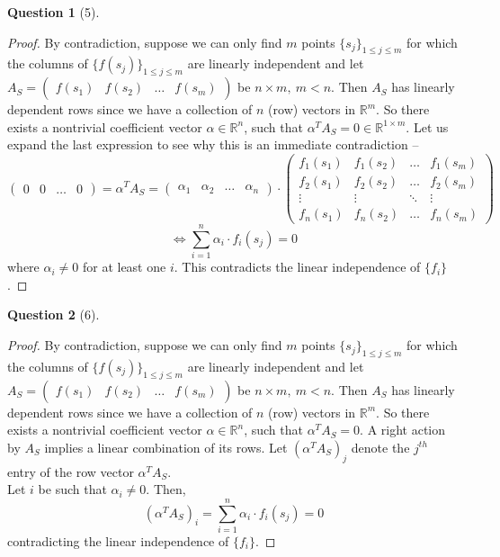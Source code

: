 \documentclass[11pt]{article}
\theoremstyle{quest}
\newtheorem*{question}{Question}
\begin{document}
\begin{question}[5]
\end{question}
\begin{proof}
By contradiction, suppose we can only find $m$ points $\{s_j\}_{1 \le j \le m}$ for which the columns of $\{f(s_j)\}_{1 \le j \le m}$ are linearly independent and let $A_S = \begin{pmatrix}
f(s_1) & f(s_2) & \ldots & f(s_m)
\end{pmatrix}$ be $n \times m,\ m < n$. Then $A_S$ has linearly dependent rows since we have a collection of $n$ (row) vectors in $\mathbb{R}^m$. So there exists a nontrivial coefficient vector $\alpha \in \mathbb{R}^n$, such that $\alpha^T A_S = 0 \in \mathbb{R}^{1 \times m}$. Let us expand the last expression to see why this is an immediate contradiction --
$$\begin{pmatrix}
0 & 0 & \ldots & 0
\end{pmatrix} = \alpha^T A_S = \begin{pmatrix}
\alpha_1 & \alpha_2 & \ldots & \alpha_n
\end{pmatrix} \cdot \begin{pmatrix}
f_1(s_1) & f_1(s_2) & \ldots & f_1(s_m) \\
f_2(s_1) & f_2(s_2) & \ldots & f_2(s_m) \\
\vdots & \vdots & \ddots & \vdots \\
f_n(s_1) & f_n(s_2) & \ldots & f_n(s_m)
\end{pmatrix} $$
$$\iff \sum_{i=1}^n \alpha_i \cdot f_i(s_j) = 0$$
where $\alpha_i \ne 0$ for at least one $i$. This contradicts the linear independence of $\{f_i\}$.
\end{proof}

\begin{question}[6]
\end{question}
\begin{proof}
By contradiction, suppose we can only find $m$ points $\{s_j\}_{1 \le j \le m}$ for which the columns of $\{f(s_j)\}_{1 \le j \le m}$ are linearly independent and let $A_S = \begin{pmatrix}
f(s_1) & f(s_2) & \ldots & f(s_m)
\end{pmatrix}$ be $n \times m,\ m < n$. Then $A_S$ has linearly dependent rows since we have a collection of $n$ (row) vectors in $\mathbb{R}^m$. So there exists a nontrivial coefficient vector $\alpha \in \mathbb{R}^n$, such that $\alpha^T A_S = 0$. A right action by $A_S$ implies a linear combination of its rows. Let $(\alpha^T A_S)_j$ denote the $j^{th}$ entry of the row vector $\alpha^T A_S$.
\\Let $i$ be such that $\alpha_i \ne 0$. Then,
$$(\alpha^T A_S)_i = \sum_{i=1}^n \alpha_i \cdot f_i(s_j) = 0$$
contradicting the linear independence of $\{f_i\}$.
\end{proof}
\end{document}

